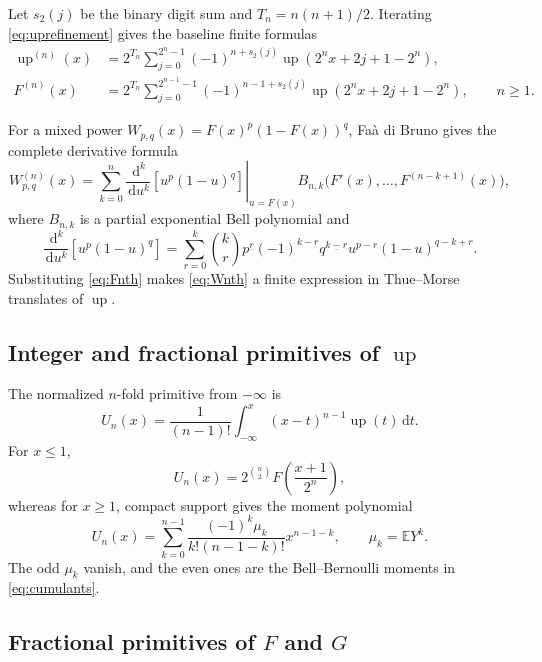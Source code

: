 \documentclass[11pt,oneside]{article}
\theoremstyle{definition}
\theoremstyle{remark}
\newcommand{\F}{F}
\newcommand{\G}{G}
\newcommand{\Up}{\operatorname{up}}
\newcommand{\E}{\mathbb E}
\newcommand{\dd}{\,\mathrm d}
\begin{document}
Let \(s_2(j)\) be the binary digit sum and \(T_n=n(n+1)/2\).  Iterating
\eqref{eq:uprefinement} gives the baseline finite formulas
\begin{align}
 \Up^{(n)}(x)
 &=2^{T_n}\sum_{j=0}^{2^n-1}
 (-1)^{n+s_2(j)}
 \Up(2^nx+2j+1-2^n),\label{eq:upnth}\\
 \F^{(n)}(x)
 &=2^{T_n}\sum_{j=0}^{2^{n-1}-1}
 (-1)^{n-1+s_2(j)}
 \Up(2^nx+2j+1-2^n),\qquad n\ge1.
 \label{eq:Fnth}
\end{align}

For a mixed power
\(W_{p,q}(x)=\F(x)^p(1-\F(x))^q\), Fa\`a di Bruno gives the complete derivative
formula
\begin{equation}\label{eq:Wnth}
 W_{p,q}^{(n)}(x)
 =\sum_{k=0}^n
 \left.\frac{\dd^k}{\dd u^k}[u^p(1-u)^q]\right|_{u=\F(x)}
 B_{n,k}\bigl(\F'(x),\ldots,\F^{(n-k+1)}(x)\bigr),
\end{equation}
where \(B_{n,k}\) is a partial exponential Bell polynomial and
\begin{equation}\label{eq:outerderiv}
 \frac{\dd^k}{\dd u^k}[u^p(1-u)^q]
 =\sum_{r=0}^k\binom kr
 p^{\underline r}(-1)^{k-r}q^{\underline{k-r}}
 u^{p-r}(1-u)^{q-k+r}.
\end{equation}
Substituting \eqref{eq:Fnth} makes \eqref{eq:Wnth} a finite expression in
Thue--Morse translates of \(\Up\).

\subsection{Integer and fractional primitives of \(\Up\)}

The normalized \(n\)-fold primitive from \(-\infty\) is
\begin{equation}
 U_n(x)=\frac1{(n-1)!}\int_{-\infty}^x(x-t)^{n-1}\Up(t)\dd t.
\end{equation}
For \(x\le1\),
\begin{equation}\label{eq:upprimitive}
 U_n(x)=2^{\binom n2}\F\!\left(\frac{x+1}{2^n}\right),
\end{equation}
whereas for \(x\ge1\), compact support gives the moment polynomial
\begin{equation}\label{eq:upprimitivepoly}
 U_n(x)=\sum_{k=0}^{n-1}
 \frac{(-1)^k\mu_k}{k!(n-1-k)!}x^{n-1-k},
 \qquad \mu_k=\E Y^k.
\end{equation}
The odd \(\mu_k\) vanish, and the even ones are the Bell--Bernoulli moments in
\eqref{eq:cumulants}.

\subsection{Fractional primitives of \(\F\) and \(\G\)}
\end{document}
